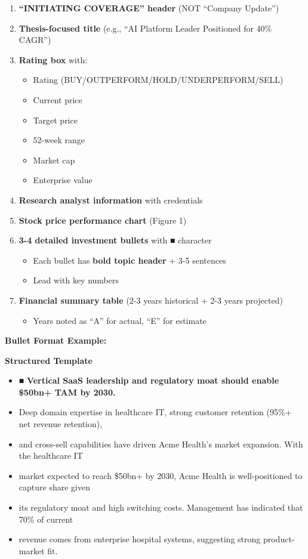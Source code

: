 \documentclass[11pt]{article}
\begin{document}
\begin{enumerate}[leftmargin=*,itemsep=2pt,topsep=2pt]
\item {} \textbf{``INITIATING COVERAGE'' header} (NOT ``Company Update'')
\item {} \textbf{Thesis-focused title} (e.g., ``AI Platform Leader Positioned for 40\% CAGR'')
\item {} \textbf{Rating box} with:
\begin{itemize}[leftmargin=*,itemsep=2pt,topsep=2pt]
\item {} Rating (BUY/OUTPERFORM/HOLD/UNDERPERFORM/SELL)
\item {} Current price
\item {} Target price
\item {} 52-week range
\item {} Market cap
\item {} Enterprise value
\end{itemize}
\item {} \textbf{Research analyst information} with credentials
\item {} \textbf{Stock price performance chart} (Figure 1)
\item {} \textbf{3-4 detailed investment bullets} with ■ character
\begin{itemize}[leftmargin=*,itemsep=2pt,topsep=2pt]
\item {} Each bullet has \textbf{bold topic header} + 3-5 sentences
\item {} Lead with key numbers
\end{itemize}
\item {} \textbf{Financial summary table} (2-3 years historical + 2-3 years projected)
\begin{itemize}[leftmargin=*,itemsep=2pt,topsep=2pt]
\item {} Years noted as ``A'' for actual, ``E'' for estimate
\end{itemize}
\end{enumerate}

\textbf{Bullet Format Example:}

\textbf{Structured Template}
\begin{itemize}[leftmargin=*,itemsep=2pt,topsep=2pt]
\item {} ■ \textbf{Vertical SaaS leadership and regulatory moat should enable \$50bn+ TAM by 2030.}
\item {} Deep domain expertise in healthcare IT, strong customer retention (95\%+ net revenue retention),
\item {} and cross-sell capabilities have driven Acme Health's market expansion. With the healthcare IT
\item {} market expected to reach \$50bn+ by 2030, Acme Health is well-positioned to capture share given
\item {} its regulatory moat and high switching costs. Management has indicated that 70\% of current
\item {} revenue comes from enterprise hospital systems, suggesting strong product-market fit.
\end{itemize}
\end{document}

